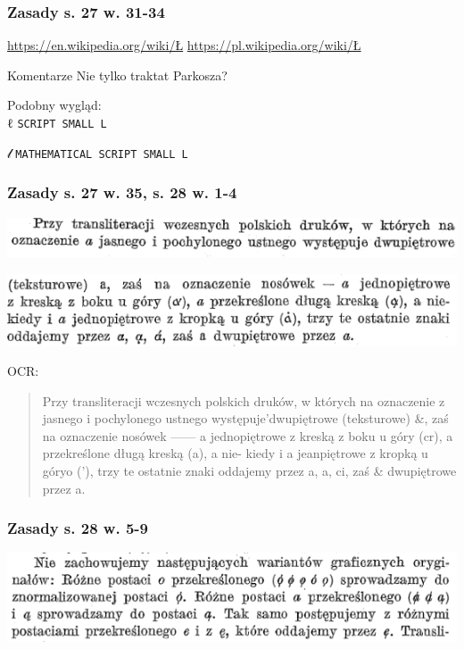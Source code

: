 \documentclass[pdfpagemode=UseNone]{beamer}
\begin{document}
\begin{frame}
  \frametitle{Zasady s. 27 w. 31-34}

  \url{https://en.wikipedia.org/wiki/Ł}
  \url{https://pl.wikipedia.org/wiki/Ł}
  
  \begin{block}{Komentarze}
      Nie tylko traktat Parkosza?

      Podobny wygląd:\\
      
      {ℓ} \texttt{SCRIPT SMALL L}

      {𝓁} \texttt{MATHEMATICAL SCRIPT SMALL L}
      
    \end{block}
\end{frame}


\begin{frame}
  \frametitle{Zasady s. 27 w. 35, s. 28 w. 1-4}
  \includegraphics[width=\hsize]{img/Zasady27-35}
  
  \includegraphics[width=\hsize]{img/Zasady28-1_4}

  OCR:
  \begin{quote}
Przy transliteracji wczesnych polskich druków, w których na
oznaczenie z jasnego i pochylonego ustnego występuje'dwupiętrowe
(teksturowe) \&, zaś na oznaczenie nosówek —— a jednopiętrowe
z kreską z boku u góry (cr), a przekreślone długą kreską (a), a nie-
kiedy i a jeanpiętrowe z kropką u góryo ('), trzy te ostatnie znaki
oddajemy przez a, a, ci, zaś \& dwupiętrowe przez a. 
\end{quote}
\end{frame}

\begin{frame}
  \frametitle{Zasady  s. 28 w. 5-9}
  \includegraphics[width=\hsize]{img/Zasady28-5_9}

\end{frame}
\end{document}
